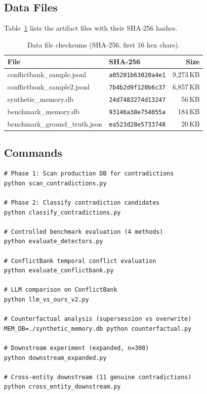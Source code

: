 \documentclass{article}
\begin{document}
\subsection{Data Files}

Table~\ref{tab:hashes} lists the artifact files with their SHA-256 hashes.



\begin{table}[h]
\centering
\caption{Data file checksums (SHA-256, first 16 hex chars).}
\begin{tabular}{llr}
\toprule
File & SHA-256 & Size \\
\midrule
conflictbank\_sample.jsonl & \texttt{a05201b63020a4e1} & 9{,}273\,KB \\
conflictbank\_sample2.jsonl & \texttt{7b4b2d9f120b6c37} & 6{,}857\,KB \\
synthetic\_memory.db & \texttt{24d7483274d13247} & 56\,KB \\
benchmark\_memory.db & \texttt{93146a38e754055a} & 184\,KB \\
benchmark\_ground\_truth.json & \texttt{ea523d28e5733748} & 20\,KB \\
\bottomrule
\end{tabular}
\label{tab:hashes}
\end{table}

\subsection{Commands}

\begin{verbatim}
# Phase 1: Scan production DB for contradictions
python scan_contradictions.py

# Phase 2: Classify contradiction candidates
python classify_contradictions.py

# Controlled benchmark evaluation (4 methods)
python evaluate_detectors.py

# ConflictBank temporal conflict evaluation
python evaluate_conflictbank.py

# LLM comparison on ConflictBank
python llm_vs_ours_v2.py

# Counterfactual analysis (supersession vs overwrite)
MEM_DB=./synthetic_memory.db python counterfactual.py

# Downstream experiment (expanded, n=300)
python downstream_expanded.py

# Cross-entity downstream (11 genuine contradictions)
python cross_entity_downstream.py
\end{verbatim}
\end{document}
